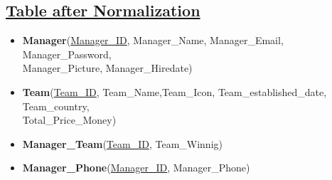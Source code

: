 \subsection*{\underline{Table after Normalization}}
\begin{itemize}
    \item \textbf{Manager}(\underline{Manager\_ID}, Manager\_Name, Manager\_Email, Manager\_Password,\\Manager\_Picture, Manager\_Hiredate)
    \item \textbf{Team}(\underline{Team\_ID}, Team\_Name,Team\_Icon, Team\_established\_date, Team\_country,\\Total\_Price\_Money)
    \item \textbf{Manager\_Team}(\underline{Team\_ID}, Team\_Winnig)
    \item \textbf{Manager\_Phone}(\underline{Manager\_ID}, Manager\_Phone)
\end{itemize}
\clearpage